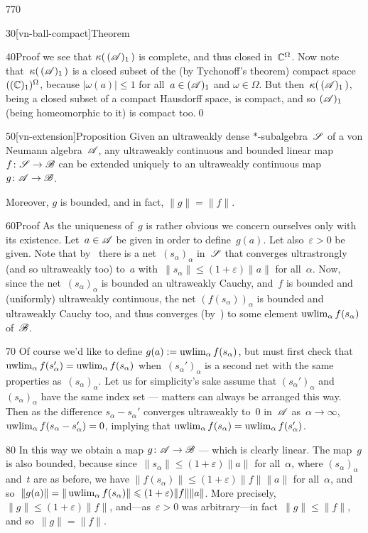 \begin{parsec}{770}
\begin{point}{30}[vn-ball-compact]{Theorem}
\begin{point}{40}{Proof}
we see that $\kappa(\,(\mathscr{A})_1\,)$
is complete,
and thus closed in~$\mathbb{C}^\Omega$.
Now note that~$\kappa(\,(\mathscr{A})_1\,)$ is a closed subset 
of the (by Tychonoff's theorem) compact
space~$((\mathbb{C})_1)^\Omega$, 
because $\left|\omega(a)\right|\leq 1$ for all~$a\in(\mathscr{A})_1$
and $\omega\in\Omega$.
But then~$\kappa(\,(\mathscr{A})_1\,)$,
being a closed subset of a compact Hausdorff space,
is compact,
and so $(\mathscr{A})_1$ (being homeomorphic to it) is compact too.\qed
\end{point}
\end{point}
\begin{point}{50}[vn-extension]{Proposition}%
Given an ultraweakly dense $*$-subalgebra~$\mathscr{S}$
of a von Neumann algebra~$\mathscr{A}$,
any ultraweakly continuous and bounded linear map~$f\colon \mathscr{S}\to\mathscr{B}$
can be extended uniquely
to an ultraweakly continuous map~$g\colon \mathscr{A}\to\mathscr{B}$.

Moreover, $g$ is bounded,
and in fact,  $\|g\|=\|f\|$.
\begin{point}{60}{Proof}%
As the uniqueness of~$g$ is rather obvious
we concern ourselves only with its existence.
Let~$a\in\mathscr{A}$ be given
in order to define~$g(a)$.
Let also~$\varepsilon>0$ be given.
Note that by~ 
there is a net~$(s_\alpha)_\alpha$
in~$\mathscr{S}$
that converges ultrastrongly (and so ultraweakly too)
to~$a$
with~$\|s_\alpha \|\leq(1+\varepsilon)\|a\|$
for all~$\alpha$.
Now,
since the net~$(s_\alpha)_\alpha$
is bounded an ultraweakly Cauchy,
and~$f$ is bounded and (uniformly) ultraweakly continuous,
the net
$(f(s_\alpha))_\alpha$
is bounded and ultraweakly Cauchy too,
and thus converges (by~)
to some element
$\uwlim_\alpha f(s_\alpha)$
of~$\mathscr{B}$.
\begin{point}{70}%
Of course we'd like to define $g(a):=\uwlim_\alpha
f(s_\alpha)$,
but must first check
that $\uwlim_\alpha f(s_\alpha')
=\uwlim_\alpha f(s_\alpha)$
when~$(s_\alpha')_\alpha$ is a second net with the same properties
as~$(s_\alpha)_\alpha$.
Let us for simplicity's sake
assume that $(s_\alpha')_\alpha$ and~$(s_\alpha)_\alpha$
have the same index set
--- matters can always be arranged this way.
Then as the difference $s_\alpha-s_\alpha'$
converges ultraweakly to~$0$ in~$\mathscr{A}$ as~$\alpha\to\infty$,
$\uwlim_\alpha f(s_\alpha-s_\alpha')=0$,
implying that $\uwlim_\alpha f(s_\alpha)
= \uwlim_\alpha f(s_\alpha')$.
\end{point}
\begin{point}{80}%
In this way
we obtain a map $g \colon \mathscr{A}\to\mathscr{B}$
--- which is clearly linear.
The map~$g$ is also bounded,
because since~$\|s_\alpha\|\leq (1+\varepsilon)\|a\|$
for all~$\alpha$,
where $(s_\alpha)_\alpha$ and~$t$ are as before,
we have $\|f (s_\alpha)\|\leq (1+\varepsilon) \|f\|\|a\|$
for all~$\alpha$,
and so~$\|g(a)\|=\|\uwlim_\alpha f(s_\alpha)\|
\leq (1+\varepsilon) \|f \|\|a\|$.
More precisely, $\|g\|\leq (1+\varepsilon)\|f\|$,
and---as~$\varepsilon>0$ was arbitrary---in 
fact~$\|g\|\leq \|f\|$, and so~$\|g\|=\|f\|$.


\end{point}
\end{point}
\end{point}
\end{parsec}
